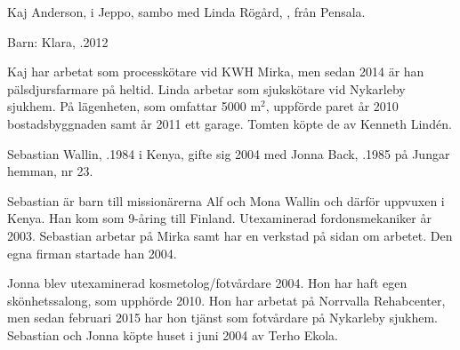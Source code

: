 %
Kaj Anderson,  i Jeppo, sambo med Linda Rögård, , från Pensala.

Barn: Klara, .2012

Kaj har arbetat som processkötare vid KWH Mirka, men sedan 2014  är	han pälsdjursfarmare på heltid. Linda arbetar som sjukskötare vid Nykarleby sjukhem. På lägenheten, som omfattar 5000 m$^2$, uppförde paret  år 2010 bostadsbyggnaden samt år 2011 ett garage. Tomten köpte de av Kenneth Lindén.



%



%
Sebastian Wallin, .1984 i Kenya, gifte sig 2004 med Jonna Back, .1985 på Jungar hemman, nr 23.
\begin{jhchildren}
  \item {}
  \item {}
  \item {}
\end{jhchildren}

Sebastian är barn till missionärerna Alf och Mona Wallin och därför	uppvuxen i Kenya. Han kom som 9-åring till Finland. Utexaminerad fordonsmekaniker år 2003. Sebastian arbetar på Mirka samt har en verkstad på sidan om arbetet. Den egna firman startade han 2004.

Jonna blev utexaminerad kosmetolog/fotvårdare 2004. Hon har haft egen skönhetssalong, som upphörde 2010. Hon har arbetat på Norrvalla Rehabcenter, men sedan februari 2015 har hon tjänst som fotvårdare på Nykarleby sjukhem. Sebastian och Jonna köpte huset i juni 2004  av Terho Ekola.


